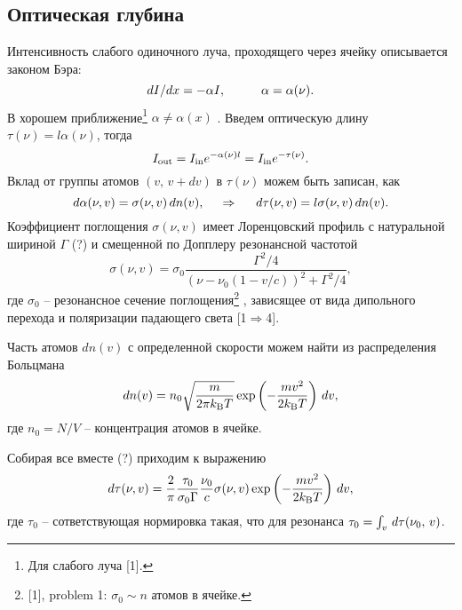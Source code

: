 \subsection*{Оптическая глубина}


Интенсивность слабого одиночного луча, проходящего через ячейку описывается законом Бэра:
\begin{equation*}
    d I / d x = - \alpha I,
    \hspace{10 mm} 
    \alpha = \alpha (\nu).
\end{equation*}
В хорошем приближение\footnote{
    Для слабого луча [1].
}  $\alpha \neq \alpha(x)$ . 
Введем оптическую длину $\tau(\nu) = l \alpha(\nu)$, тогда
\begin{equation*}
    I_{\textnormal{out}} = I_{\textnormal{in}} e^{- \alpha(\nu) l} = I_{\textnormal{in}} e^{- \tau(\nu)}.
\end{equation*}
Вклад от группы атомов $(v,\, v + d v)$ в $\tau(\nu)$ можем быть записан, как
\begin{equation*}
    d \alpha (\nu, v) = \sigma(\nu, v) \, dn(v),
    \hspace{0.5cm} \Rightarrow \hspace{0.5cm}    
    d \tau(\nu, v) = l \sigma(\nu, v) \, dn(v).
\end{equation*}
Коэффициент поглощения $\sigma(\nu, v)$ имеет Лоренцовский профиль с натуральной шириной $\Gamma$ (?) и смещенной по Допплеру резонансной частотой
\begin{equation}
    \label{1_4}
    \sigma(\nu, v) = \sigma_0 \frac{\Gamma^2/4}{(\nu - \nu_0(1 - v / c))^2 + \Gamma^2/4},
\end{equation}
где $\sigma_0$ -- резонансное сечение поглощения\footnote{
    [1], problem 1: $\sigma_0 \sim n$ атомов в ячейке.
} , зависящее от вида дипольного перехода и поляризации падающего света [1$\Rightarrow$4]. 

Часть атомов $d n (v)$ с определенной скорости можем найти из распределения Больцмана
\begin{equation*}
    d n(v) = n_0 \sqrt{\frac{m}{2 \pi k_{\textnormal{B}} T}} \exp\left(
        - \frac{m v^2}{2 k_{\textnormal{B}} T} 
    \right) \, d v,
\end{equation*} 
где $n_0 = N/V$ -- концентрация атомов в ячейке. 

Собирая все вместе (?) приходим к выражению
\begin{equation}
    \label{1_6}
    d \tau (\nu, v) = \frac{2}{\pi} \frac{\tau_0}{\sigma_0 \Gamma} \frac{\nu_0}{c} 
     \sigma(\nu, v) \exp\left(
        - \frac{m v^2}{2 k_{\textnormal{B}} T}
     \right) \, d v,
\end{equation}
где $\tau_0$  -- сответствующая нормировка такая, что для резонанса $\tau_0 = \int_v \, d \tau (\nu_0,\, v)$.



